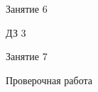 \begin{class}[number=6]
	\begin{listofex}
		\item Занятие 6
	\end{listofex}
\end{class}

\begin{homework}[number=3]
	\begin{listofex}
		\item ДЗ 3
	\end{listofex}
\end{homework}

\begin{class}[number=7]
	\begin{listofex}
		\item Занятие 7
	\end{listofex}
\end{class}

\begin{exam}
	\begin{listofex}
		\item Проверочная работа
	\end{listofex}
\end{exam}
